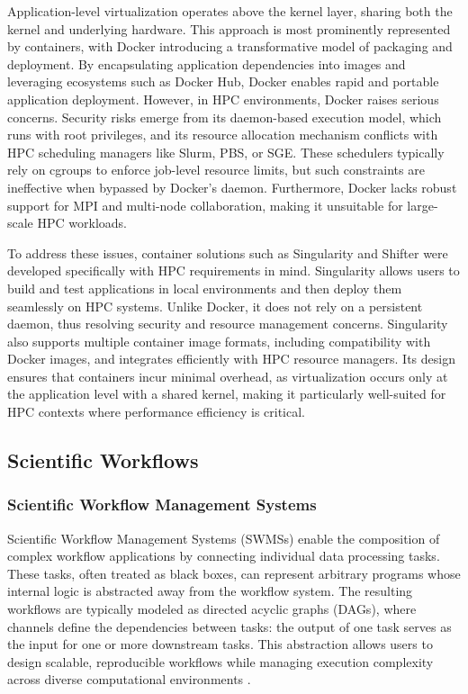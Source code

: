 Application-level virtualization operates above the kernel layer, sharing both the kernel and underlying hardware. This approach is most prominently represented by containers, with Docker introducing a transformative model of packaging and deployment. By encapsulating application dependencies into images and leveraging ecosystems such as Docker Hub, Docker enables rapid and portable application deployment. However, in HPC environments, Docker raises serious concerns. Security risks emerge from its daemon-based execution model, which runs with root privileges, and its resource allocation mechanism conflicts with HPC scheduling managers like Slurm, PBS, or SGE. These schedulers typically rely on cgroups to enforce job-level resource limits, but such constraints are ineffective when bypassed by Docker’s daemon. Furthermore, Docker lacks robust support for MPI and multi-node collaboration, making it unsuitable for large-scale HPC workloads.

To address these issues, container solutions such as Singularity and Shifter were developed specifically with HPC requirements in mind. Singularity allows users to build and test applications in local environments and then deploy them seamlessly on HPC systems. Unlike Docker, it does not rely on a persistent daemon, thus resolving security and resource management concerns. Singularity also supports multiple container image formats, including compatibility with Docker images, and integrates efficiently with HPC resource managers. Its design ensures that containers incur minimal overhead, as virtualization occurs only at the application level with a shared kernel, making it particularly well-suited for HPC contexts where performance efficiency is critical.


\subsection{Scientific Workflows}
\label{sec:background_workflows}

\subsubsection{Scientific Workflow Management Systems}
\label{sec:background_workflows_swms}
Scientific Workflow Management Systems (SWMSs) enable the composition of complex workflow applications by connecting individual data processing tasks. These tasks, often treated as black boxes, can represent arbitrary programs whose internal logic is abstracted away from the workflow system. The resulting workflows are typically modeled as directed acyclic graphs (DAGs), where channels define the dependencies between tasks: the output of one task serves as the input for one or more downstream tasks. This abstraction allows users to design scalable, reproducible workflows while managing execution complexity across diverse computational environments \cite{thamsen2025energyawareworkflowexecutionoverview}.

